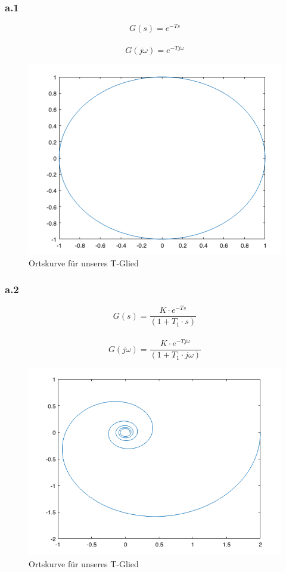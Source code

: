 \documentclass{article}
\begin{document}
			\subsubsection{a.1}
				$$G(s) = e^{-Ts}$$
				\\
				$$G(j\omega) = e^{-Tj\omega}$$
				\begin{figure}[h]
					\includegraphics[scale = 0.6, center]{./Ortskurve_3_1.png}
					\caption{Ortskurve für unseres T-Glied}
					\label{fig3: Ortskurve}
				\end{figure}
\newpage
			\subsubsection{a.2}
				$$G(s) = \frac{K\cdot e^{-Ts}}{(1+T_1\cdot s)}$$
				\\
				$$G(j\omega) = \frac{K\cdot e^{-Tj\omega}}{(1+T_1\cdot j\omega)}$$
				\begin{figure}[h]
					\includegraphics[scale = 0.7, center]{./Ortskurve_3_2.png}
					\caption{Ortskurve für unseres T-Glied}
					\label{fig3: Ortskurve}
				\end{figure}
\newpage
\end{document}
